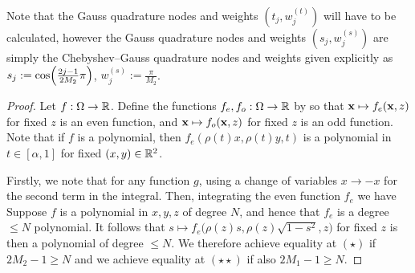 \remark Note that the Gauss quadrature nodes and weights $(t_j, w_j^{(t)})$ will have to be calculated, however the Gauss quadrature nodes and weights $(s_j, w_j^{(s)})$ are simply the Chebyshev--Gauss quadrature nodes and weights given explicitly \cite[3.5.23]{DLMF} as $s_j := \cos \fpr(\frac{2j - 1}{2M_2} \pi)$, $w_j^{(s)} := \frac{\pi}{M_2}$.

\begin{proof}
Let $f : \Omega \to \mathbb{R}$. Define the functions $f_e, f_o : \Omega \to \mathbb{R}$ by 
so that $\mathbf{x} \mapsto f_e(\mathbf{x}, z)$ for fixed $z$ is an even function, and $\mathbf{x} \mapsto f_o(\mathbf{x}, z)$ for fixed $z$ is an odd function. Note that if $f$ is a polynomial, then $f_e(\rho(t)x, \rho(t)y, t)$ is a polynomial in $t \in [\alpha,1]$ for fixed $(x,y) \in \mathbb{R}^2$. 

Firstly, we note that
for any function $g$, using a change of variables $x \to -x$ for the second term in the integral. Then, integrating the even function $f_e$ we have
Suppose $f$ is a polynomial in $x,y,z$ of degree $N$, and hence that $f_e$ is a degree $\le N$ polynomial. It follows that $s \mapsto f_e\big(\rho(z)s,\rho(z)\sqrt{1-s^2}, z\big)$ for fixed $z$ is then a polynomial of degree $\le N$. We therefore achieve equality at $(\star)$ if $2M_2 - 1 \ge N$ and we achieve equality at $(\star \star)$ if also $2M_1 - 1 \ge N$.


\end{proof}
